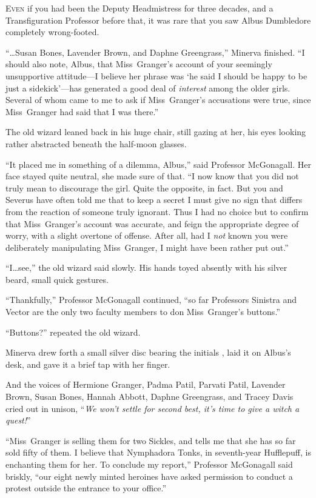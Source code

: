 
\lettrine{E}{ven} if you had
been the Deputy Headmistress for three decades, and a Transfiguration Professor before that, it was rare that you saw Albus Dumbledore completely wrong-footed.

“…Susan Bones, Lavender Brown, and Daphne Greengrass,” Minerva finished. “I should also note, Albus, that Miss~Granger’s account of your seemingly unsupportive attitude—I believe her phrase was ‘he said I should be happy to be just a sidekick’—has generated a good deal of \emph{interest} among the older girls. Several of whom came to me to ask if Miss~Granger’s accusations were true, since Miss~Granger had said that I was there.”

The old wizard leaned back in his huge chair, still gazing at her, his eyes looking rather abstracted beneath the half-moon glasses.

“It placed me in something of a dilemma, Albus,” said Professor McGonagall. Her face stayed quite neutral, she made sure of that. “I now know that you did not truly mean to discourage the girl. Quite the opposite, in fact. But you and Severus have often told me that to keep a secret I must give no sign that differs from the reaction of someone truly ignorant. Thus I had no choice but to confirm that Miss~Granger’s account was accurate, and feign the appropriate degree of worry, with a slight overtone of offense. After all, had I \emph{not} known you were deliberately manipulating Miss~Granger, I might have been rather put out.”

“I…see,” the old wizard said slowly. His hands toyed absently with his silver beard, small quick gestures.

“Thankfully,” Professor McGonagall continued, “so far Professors Sinistra and Vector are the only two faculty members to don Miss~Granger’s buttons.”

“Buttons?” repeated the old wizard.

Minerva drew forth a small silver disc bearing the initials \SPHEW, laid it on Albus’s desk, and gave it a brief tap with her finger.

And the voices of Hermione Granger, Padma Patil, Parvati Patil, Lavender Brown, Susan Bones, Hannah Abbott, Daphne Greengrass, and Tracey Davis cried out in unison, “\emph{We won’t settle for second best, it’s time to give a witch a quest!}”

“Miss~Granger is selling them for two Sickles, and tells me that she has so far sold fifty of them. I believe that Nymphadora Tonks, in seventh-year Hufflepuff, is enchanting them for her. To conclude my report,” Professor McGonagall said briskly, “our eight newly minted heroines have asked permission to conduct a protest outside the entrance to your office.”

